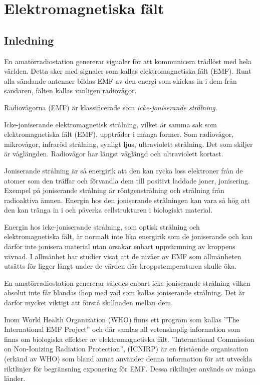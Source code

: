 
\chapter{Elektromagnetiska fält}
\label{EMF}

\section{Inledning}
En amatörradiostation genererar signaler för att kommunicera trådlöst
med hela världen.
Detta sker med signaler som kallas elektromagnetiska fält (EMF).
Runt alla sändande antenner bildas EMF av den energi som skickas in i dem från
sändaren, fälten kallas vanligen radiovågor.

Radiovågorna (EMF) är klassificerade som \emph{icke-joniserande strålning}.

Icke-joniserande elektromagnetisk strålning, vilket är samma sak som
elektromagnetiska fält (EMF), uppträder i många former.
Som radiovågor, mikrovågor, infraröd strålning, synligt ljus, ultraviolett
strålning.
Det som skiljer är våglängden. Radiovågor har längst våglängd och
ultraviolett kortast.

Joniserande strålning är så energirik att den kan rycka loss elektroner från de
atomer som den träffar och förvandla dem till positivt laddade joner,
jonisering.
Exempel på joniserande strålning är röntgenstrålning och strålning från
radioaktiva ämnen.
Energin hos den joniserande strålningen kan vara så hög att den kan
tränga in i och påverka cellstrukturen i biologiskt material.

Energin hos icke-joniserande strålning, som optisk strålning och
elektromagnetiska fält, är normalt inte lika energirik som de joniserande och
kan därför inte jonisera material utan orsakar enbart uppvärmning av kroppens
vävnad.
I allmänhet har studier visat att de nivåer av EMF som allmänheten utsätts för
ligger långt under de värden där kroppstemperaturen skulle öka.

En amatörradiostation genererar således enbart icke-joniserande strålning
vilken absolut inte får blandas ihop med vad som kallas joniserande strålning.
Det är därför mycket viktigt att förstå skillnaden mellan dem.

Inom World Health Organization (WHO) finns ett program som kallas
''The International EMF Project'' och där samlas all vetenskaplig
information som finns om biologiska effekter av elektromagnetiska fält.
''International Commission on Non-Ionizing Radiation Protection'', (ICNIRP)
är en fristående organisation (erkänd av WHO) som bland annat använder denna
information för att utveckla riktlinjer för begränsning exponering för EMF.
Dessa riktlinjer används av många länder.

